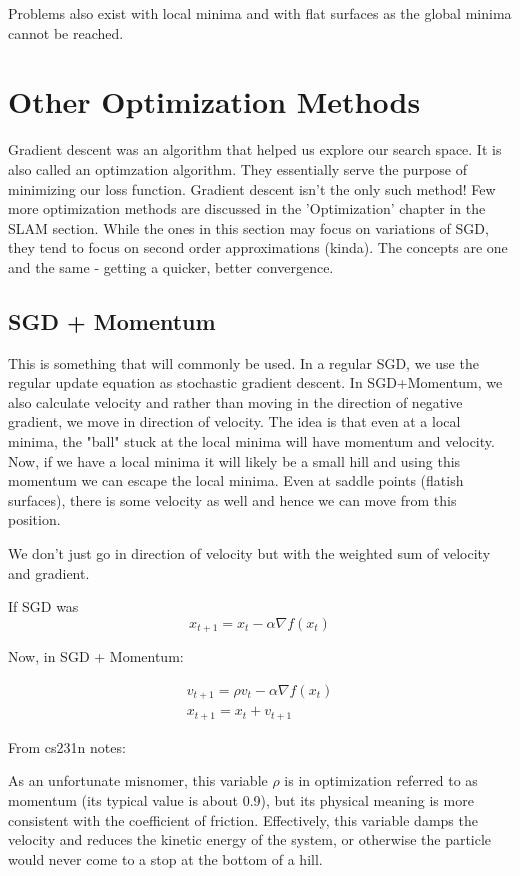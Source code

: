 Problems also exist with local minima and with flat surfaces as the global minima cannot be reached. 

\section{Other Optimization Methods}

Gradient descent was an algorithm that helped us explore our search space. It is also called an optimzation algorithm. They essentially serve the purpose of minimizing our loss function. Gradient descent isn't the only such method! Few more optimization methods are discussed in the 'Optimization' chapter in the SLAM section. While the ones in this section may focus on variations of SGD, they tend to focus on second order approximations (kinda). The concepts are one and the same - getting a quicker, better convergence.

\subsection{SGD + Momentum}

This is something that will commonly be used. In a regular SGD, we use the regular update equation as stochastic gradient descent. In SGD+Momentum, we also calculate velocity and rather than moving in the direction of negative gradient, we move in direction of velocity. The idea is that even at a local minima, the "ball" stuck at the local minima will have momentum and velocity. Now, if we have a local minima it will likely be a small hill and using this momentum we can escape the local minima. Even at saddle points (flatish surfaces), there is some velocity as well and hence we can move from this position. 

We don't just go in direction of velocity but with the weighted sum of velocity and gradient.

If SGD was \[ x_{t+1} = x_t - \alpha \nabla f(x_t) \]

Now, in SGD + Momentum:

\begin{equation}
\begin{split}
    v_{t+1} = \rho v_t - \alpha \nabla f(x_t) \\
    x_{t+1} = x_t + v_{t+1}
\end{split}
\end{equation}

From cs231n notes:

As an unfortunate misnomer, this variable $\rho$ is in optimization referred to as momentum (its typical value is about 0.9), but its physical meaning is more consistent with the coefficient of friction. Effectively, this variable damps the velocity and reduces the kinetic energy of the system, or otherwise the particle would never come to a stop at the bottom of a hill. 

